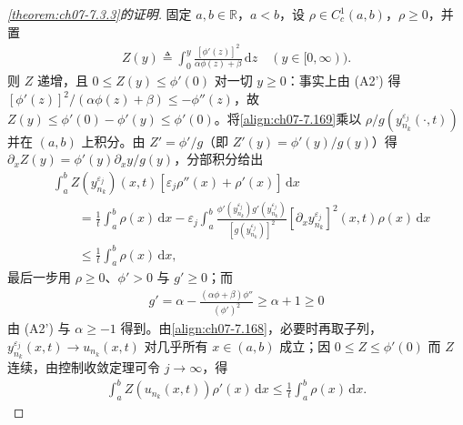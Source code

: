 \documentclass[../../main.tex]{subfiles}%
\begin{document}
\begin{proof}[\cref{theorem:ch07-7.3.3}的证明]
固定 $a,b\in\mathbb{R}$，$a<b$，设 $\rho\in C_c^1(a,b)$，$\rho\geqslant0$，并置
\begin{align*}
Z(y)\triangleq\int_0^y\frac{[\phi'(z)]^2}{\alpha\phi(z)+\beta}\,\mathrm{d}z\quad(y\in[0,\infty)).
\end{align*}
则 $Z$ 递增，且 $0\leqslant Z(y)\leqslant\phi'(0)$ 对一切 $y\geqslant0$：事实上由 (A2') 得 $[\phi'(z)]^2/(\alpha\phi(z)+\beta)\leqslant-\phi''(z)$，故 $Z(y)\leqslant\phi'(0)-\phi'(y)\leqslant\phi'(0)$。将\eqref{align:ch07-7.169}乘以 $\rho/g(y_{n_k}^{\varepsilon_j}(\cdot,t))$ 并在 $(a,b)$ 上积分。由 $Z'=\phi'/g$（即 $Z'(y)=\phi'(y)/g(y)$）得 $\partial_xZ(y)=\phi'(y)\partial_xy/g(y)$，分部积分给出
\begin{align*}
&\int_a^bZ(y_{n_k}^{\varepsilon_j})(x,t)[\varepsilon_j\rho''(x)+\rho'(x)]\,\mathrm{d}x\\
&\qquad=\frac1t\int_a^b\rho(x)\,\mathrm{d}x
-\varepsilon_j\int_a^b\frac{\phi'(y_{n_k}^{\varepsilon_j})g'(y_{n_k}^{\varepsilon_j})}{[g(y_{n_k}^{\varepsilon_j})]^2}[\partial_x y_{n_k}^{\varepsilon_j}]^2(x,t)\rho(x)\,\mathrm{d}x\\
&\qquad\leqslant\frac1t\int_a^b\rho(x)\,\mathrm{d}x,
\end{align*}
最后一步用 $\rho\geqslant0$、$\phi'>0$ 与 $g'\geqslant0$；而
\begin{align*}
g'=\alpha-\frac{(\alpha\phi+\beta)\phi''}{(\phi')^2}\geqslant\alpha+1\geqslant0
\end{align*}
由 (A2') 与 $\alpha\geqslant-1$ 得到。由\eqref{align:ch07-7.168}，必要时再取子列，$y_{n_k}^{\varepsilon_j}(x,t)\to u_{n_k}(x,t)$ 对几乎所有 $x\in(a,b)$ 成立；因 $0\leqslant Z\leqslant\phi'(0)$ 而 $Z$ 连续，由控制收敛定理可令 $j\to\infty$，得
\begin{align}
\int_a^bZ(u_{n_k}(x,t))\rho'(x)\,\mathrm{d}x\leqslant\frac1t\int_a^b\rho(x)\,\mathrm{d}x. \label{align:ch07-7.170}
\end{align}


\end{proof}
\end{document}
